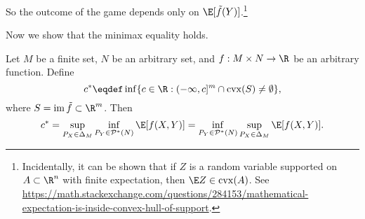 \documentclass{article}
\newcommand*{\Probstar}[1]{\mathcal{P}^*({#1})}
\newcommand*{\Probfin}[1]{\Delta_{#1}}
\DeclareMathOperator{\cvx}{cvx}
\DeclareMathOperator{\im}{im}
\begin{document}
So the outcome of the game depends only on $\E[\tilde f(Y)]$.\footnote{%
Incidentally, it can be shown that if $Z$ is a random variable supported on $A \subset \R^n$ with finite expectation, then $\E Z \in \cvx(A)$.
See \url{https://math.stackexchange.com/questions/284153/mathematical-expectation-is-inside-convex-hull-of-support}.}

Now we show that the minimax equality holds.

\begin{theorem}\label{thm:semi-finite}
  Let $M$ be a finite set, $N$ be an arbitrary set,
  and $f : M \times N \to \R$ be an arbitrary function.
  Define
  \[
  c^* \eqdef \inf\{c \in \R : (-\infty, c]^m \cap \cvx(S) \ne \emptyset\},\]
  where $S = \im \tilde f \subset \R^m$.
  Then
  \[c^* = \sup_{P_X \in \Probfin{M}} \inf_{P_Y \in \Probstar{N}} \E[f(X, Y)] = \inf_{P_Y \in \Probstar{N}} \sup_{P_X \in \Probfin{M}} \E[f(X, Y)].\]
\end{theorem}
\end{document}
